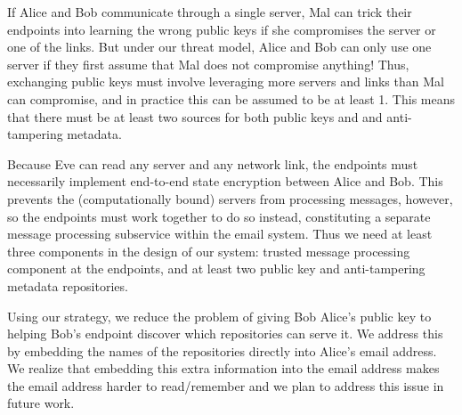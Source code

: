 If Alice and Bob communicate through a single server, Mal can trick 
their endpoints into learning the wrong public keys if she compromises 
the server or one of the links.  But under our threat model, Alice 
and Bob can only use one server if they first assume that Mal does 
not compromise anything!  Thus, exchanging public keys must involve 
leveraging more servers and links than Mal can compromise, and in 
practice this can be assumed to be at least 1.  This means that 
there must be at least two sources for both public keys and and 
anti-tampering metadata.

Because Eve can read any server and any network link, the endpoints 
must necessarily implement end-to-end state encryption between Alice 
and Bob.  This prevents the (computationally bound) servers from 
processing messages, however, so the endpoints must work together 
to do so instead, constituting a separate message processing subservice 
within the email system.  Thus we need at least three components in the 
design of our system: trusted message processing component at the 
endpoints, and at least two public key and anti-tampering metadata 
repositories.

Using our strategy, we reduce the problem of giving Bob Alice’s public 
key to helping Bob’s endpoint discover which repositories can serve it.  
We address this by embedding the names of the repositories directly into 
Alice’s email address. We realize that embedding this extra information 
into the email address makes the email address harder to read/remember 
and we plan to address this issue in future work. 
